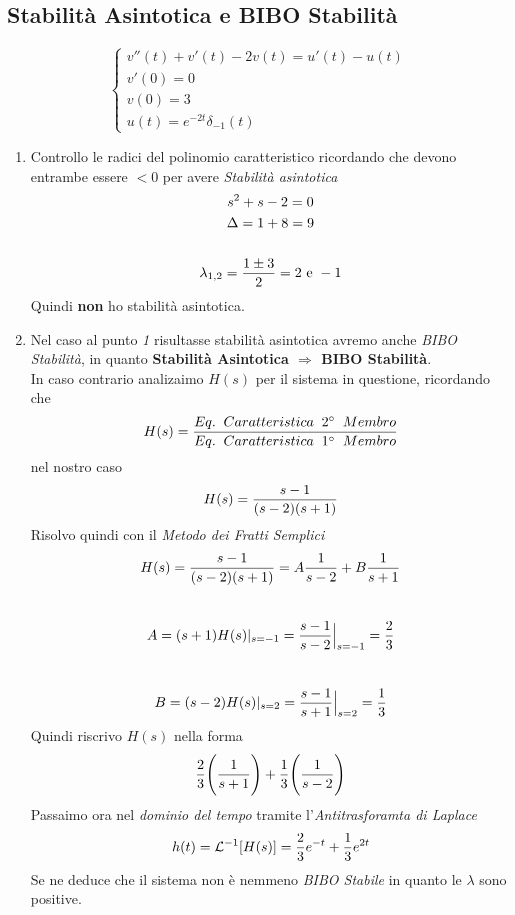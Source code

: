 \documentclass{article}
\newcommand{\AntiLaplace}{\mathop{\mathcal{L}^{-1}}}
\begin{document}
		\subsection{Stabilità Asintotica e BIBO Stabilità}
		\[
			\begin{cases}
				v''(t) + v'(t) - 2v(t) = u'(t) - u(t) \\
				v'(0) = 0 \\
				v(0) = 3 \\
				u(t) = e^{-2t}\delta_{-1}(t)
			\end{cases}
		\]
		\begin{enumerate}
			\item Controllo le radici del polinomio caratteristico ricordando che devono entrambe essere $ <0 $ per avere \textit{Stabilità asintotica}
			\[
				\begin{gathered}
					s^2 + s - 2 = 0 \\
					\Delta = 1 + 8 = 9 \\
					\\
					\lambda_{1,2} = {{1 \pm 3}\over{2}} = 2 \text{ e } -1
				\end{gathered}
			\]
			Quindi \textbf{non} ho stabilità asintotica.
			\item Nel caso al punto \textit{1} risultasse stabilità asintotica avremo anche \textit{BIBO Stabilità}, in quanto \textbf{Stabilità Asintotica $ \Rightarrow $ BIBO Stabilità}. \\
			In caso contrario analizaimo $ H(s) $ per il sistema in questione, ricordando che
			\[
				H(s) = {{Eq.\;\; Caratteristica\;\; 2^{\circ}\;\; Membro}\over{Eq.\;\; Caratteristica\;\; 1^{\circ}\;\; Membro}}
			\]
			nel nostro caso
			\[
				H(s) = {{s - 1}\over{(s - 2)(s + 1)}}
			\]
			Risolvo quindi con il \textit{Metodo dei Fratti Semplici}
			\[
				H(s) = {{s - 1}\over{(s - 2)(s + 1)}} = A{{1}\over{s - 2}} + B{{1}\over{s + 1}}
			\]
			\\
			\[
				A = (s + 1)H(s)\vert_{s=-1} = {{s - 1}\over{s - 2}}\Big\vert_{s=-1} = {{2}\over{3}}
			\]
			\\
			\[
				B = (s - 2)H(s)\vert_{s=2} = {{s - 1}\over{s + 1}}\Big\vert_{s=2} = {{1}\over{3}}
			\]
			Quindi riscrivo $ H(s) $ nella forma
			\[
				{{2}\over{3}}\Bigg( {{1}\over{s + 1}} \Bigg) + {{1}\over{3}}\Bigg( {{1}\over{s - 2}} \Bigg)
			\]
			Passaimo ora nel \textit{dominio del tempo} tramite l'\textit{Antitrasforamta di Laplace}
			\[
				h(t) = \AntiLaplace[H(s)] = {{2}\over{3}}e^{-t} + {{1}\over{3}}e^{2t}
			\]
			Se ne deduce che il sistema non è nemmeno \textit{BIBO Stabile} in quanto le $ \lambda $ sono positive.
		\end{enumerate}
\end{document}
